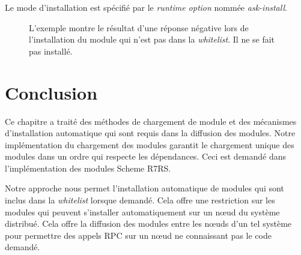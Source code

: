 Le mode d'installation est spécifié par le \textit{runtime option} nommée
\textit{ask-install}.
\begin{figure}[h]
  \caption{L'exemple montre le résultat d'une réponse négative lors de
    l'installation du module qui n'est pas dans la \textit{whitelist}.
    Il ne se fait pas installé.}
\end{figure}


\section{Conclusion}

Ce chapitre a traité des méthodes de chargement de module et des mécanismes
d'installation automatique qui sont requis dans la diffusion des modules.
Notre implémentation du chargement des modules garantit le chargement unique
des modules dans un ordre qui respecte les dépendances. Ceci est demandé dans
l'implémentation des modules Scheme R7RS.

Notre approche nous permet l'installation automatique de modules qui sont
inclus dans la \textit{whitelist} lorsque demandé.  Cela offre une restriction
sur les modules qui peuvent s'installer automatiquement sur un nœud du système
distribué. Cela offre la diffusion des modules entre les nœuds d'un tel système
pour permettre des appels RPC sur un nœud ne connaissant pas le code demandé.








